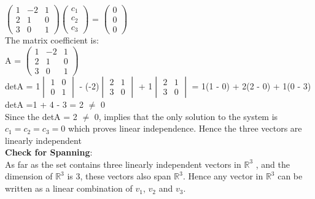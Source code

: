 \documentclass[12pt,a4paper]{article}
\begin{document}
$\begin{pmatrix}
1&-2&1\\ 2&1&0\\ 3&0&1
\end{pmatrix}$$\begin{pmatrix}
c_1\\c_2\\c_3
\end{pmatrix}$ = $\begin{pmatrix}
0\\0\\0
\end{pmatrix}$\vspace{5mm}\\
The matrix coefficient is:\vspace{5mm}\\
A = $\begin{pmatrix}
1&-2&1\\ 2&1&0\\ 3&0&1
\end{pmatrix}$\vspace{5mm}\\
detA = 1$\begin{vmatrix}
1&0\\ 0&1
\end{vmatrix}$ - (-2)$\begin{vmatrix}
2&1\\ 3&0 \end{vmatrix}$ + 1$\begin{vmatrix}
2&1\\ 3&0
\end{vmatrix}$ = 1(1 - 0) + 2(2 - 0) + 1(0 - 3)\vspace{5mm}\\
 detA =1 + 4 - 3 = 2 $\neq$ 0 \vspace{5mm}\\
 Since the detA = 2 $\neq$ 0, implies that the only solution to the system is $c_1=c_2=c_3 = 0 $ which proves linear independence. Hence the three vectors are linearly independent \vspace{5mm}\\ 
 \textbf{Check for Spanning}:\vspace{5mm}\\
 As far as the set contains three linearly independent vectors in $\mathbb{R}^3$ , and the dimension of $\mathbb{R}^3$ is 3, these vectors also span $\mathbb{R}^3$. Hence any vector in $\mathbb{R}^3$ can be written as a linear combination of $v_1$, $v_2$ and $v_3$.\\
$$
\end{document}
